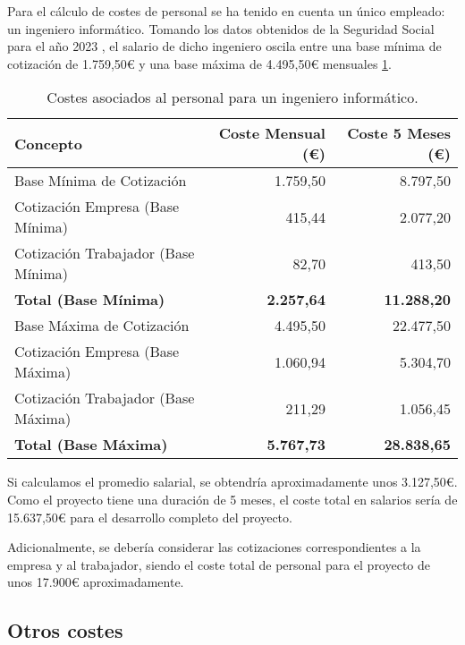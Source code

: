 Para el cálculo de costes de personal se ha tenido en cuenta un único empleado: un ingeniero informático. Tomando los datos obtenidos de la Seguridad Social para el año 2023 \cite{seg-social}, el salario de dicho ingeniero oscila entre una base mínima de cotización de 1.759,50€ y una base máxima de 4.495,50€ mensuales \ref{tab:coste-personal}.

\begin{table}[H]
    \centering
    \small 
    \setlength{\tabcolsep}{1.8pt}
    \begin{tabular}{@{}lrr@{}}
        \toprule
        \textbf{Concepto} & \textbf{Coste Mensual (€)} & \textbf{Coste 5 Meses (€)} \\
        \midrule
        Base Mínima de Cotización & 1.759,50 & 8.797,50 \\
        Cotización Empresa (Base Mínima) & 415,44 & 2.077,20 \\
        Cotización Trabajador (Base Mínima) & 82,70 & 413,50 \\
        \textbf{Total (Base Mínima)} & \textbf{2.257,64} & \textbf{11.288,20} \\
        \midrule
        Base Máxima de Cotización & 4.495,50 & 22.477,50 \\
        Cotización Empresa (Base Máxima) & 1.060,94 & 5.304,70 \\
        Cotización Trabajador (Base Máxima) & 211,29 & 1.056,45 \\
        \textbf{Total (Base Máxima)} & \textbf{5.767,73} & \textbf{28.838,65} \\
        \bottomrule
    \end{tabular}

    \caption{Costes asociados al personal para un ingeniero informático.}
    \label{tab:coste-personal}

\end{table}

Si calculamos el promedio salarial, se obtendría aproximadamente unos 3.127,50€. Como el proyecto tiene una duración de 5 meses, el coste total en salarios sería de 15.637,50€ para el desarrollo completo del proyecto.

Adicionalmente, se debería considerar las cotizaciones correspondientes a la empresa y al trabajador, siendo el coste total de personal para el proyecto de unos 17.900€ aproximadamente. 

\subsection{Otros costes}


